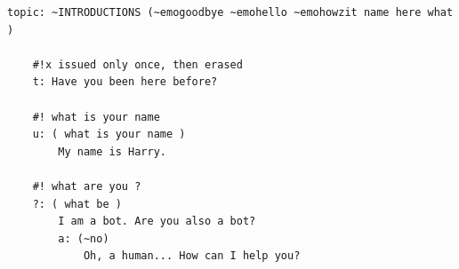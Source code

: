 \begin{center} 
  \begin{lstlisting}[language={}, captionpos=b, caption=Example topic file for ChatScript, label=listing:exampletop]   
    topic: ~INTRODUCTIONS (~emogoodbye ~emohello ~emohowzit name here what )
    
    #!x issued only once, then erased
    t: Have you been here before?
    
    #! what is your name 
    u: ( what is your name ) 
        My name is Harry.
        
    #! what are you ?
    ?: ( what be )
        I am a bot. Are you also a bot?
        a: (~no)
            Oh, a human... How can I help you?
  \end{lstlisting}
\end{center}

